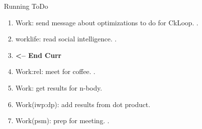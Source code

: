 \begin{columns}
\begin{column}{0.6\linewidth}
\begin{block}{Running ToDo}
\begin{enumerate}
        \item \tiny Work: send message about optimizations to do for
          CkLoop.  . 
        \item \tiny worklife: read social intelligence. . 

        \item \tiny \textbf{ <-- End Curr } 

        \item \tiny Work:rel: meet for coffee. . 
        \item \tiny Work: get results for n-body.
        \item \tiny Work(iwp:dp): add results from dot product.    
        \item \tiny Work(psm): prep for meeting. . 
        \end{enumerate}
      \end{block}
      

\end{column}
\end{columns}
